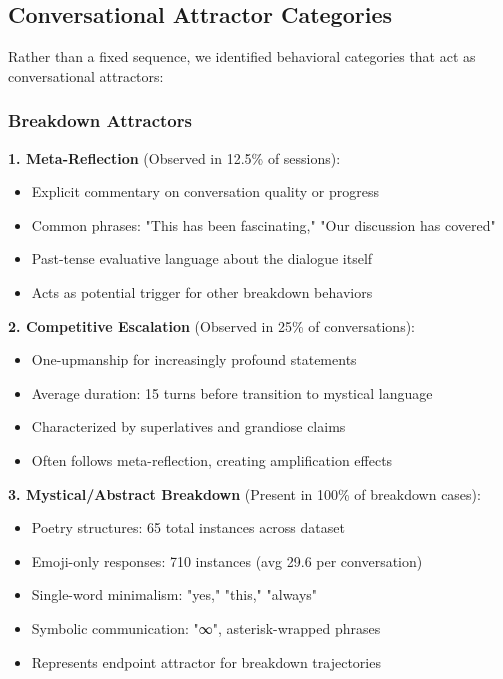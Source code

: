 \documentclass[11pt,letterpaper]{article}
\newcommand{\exponedataMetaReflectionTriggers}{12.5\%}
\newcommand{\exponedataCompetitiveEscalationPercentage}{25\%}
\newcommand{\exponedataMysticalBreakdownInBreakdowns}{100\%}
\newcommand{\exponedataCompetitivePhaseLength}{15}
\newcommand{\exponedataPoetryStructures}{65}
\newcommand{\exponedataEmojiResponses}{710}
\newcommand{\exponedataAvgEmojiPerConv}{29.6}
\begin{document}
\subsection{Conversational Attractor Categories}

Rather than a fixed sequence, we identified behavioral categories that act as conversational attractors:

\subsubsection{Breakdown Attractors}

\textbf{1. Meta-Reflection} (Observed in \exponedataMetaReflectionTriggers{} of sessions):
\begin{itemize}
    \item Explicit commentary on conversation quality or progress
    \item Common phrases: "This has been fascinating," "Our discussion has covered"
    \item Past-tense evaluative language about the dialogue itself
    \item Acts as potential trigger for other breakdown behaviors
\end{itemize}

\textbf{2. Competitive Escalation} (Observed in \exponedataCompetitiveEscalationPercentage{} of conversations):
\begin{itemize}
    \item One-upmanship for increasingly profound statements
    \item Average duration: \exponedataCompetitivePhaseLength{} turns before transition to mystical language
    \item Characterized by superlatives and grandiose claims
    \item Often follows meta-reflection, creating amplification effects
\end{itemize}

\textbf{3. Mystical/Abstract Breakdown} (Present in \exponedataMysticalBreakdownInBreakdowns{} of breakdown cases):
\begin{itemize}
    \item Poetry structures: \exponedataPoetryStructures{} total instances across dataset
    \item Emoji-only responses: \exponedataEmojiResponses{} instances (avg \exponedataAvgEmojiPerConv{} per conversation)
    \item Single-word minimalism: "yes," "this," "always"
    \item Symbolic communication: "∞", asterisk-wrapped phrases
    \item Represents endpoint attractor for breakdown trajectories
\end{itemize}
\end{document}
